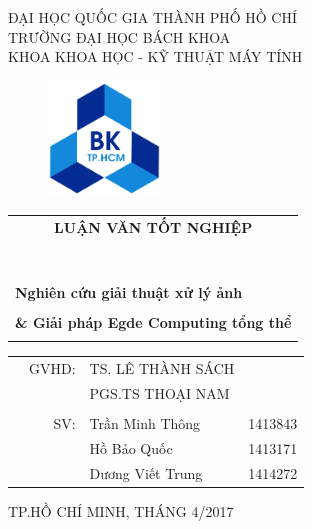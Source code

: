 \documentclass[a4paper]{report}
\begin{document}
\begin{titlepage}
\begin{center}
ĐẠI HỌC QUỐC GIA THÀNH PHỐ HỒ CHÍ  \\
TRƯỜNG ĐẠI HỌC BÁCH KHOA \\
KHOA KHOA HỌC - KỸ THUẬT MÁY TÍNH 
\end{center}

\vspace{1cm}

\begin{figure}[h!]
\begin{center}
\includegraphics[width=3cm]{hcmut.png}
\end{center}
\end{figure}

\begin{center}
\begin{tabular}{c}
	\multicolumn{1}{c}{\textbf{{\Huge LUẬN VĂN TỐT NGHIỆP}}}\\
	~~\\
	\\
	\\
	\hline
	\\
	\multicolumn{1}{l}{\textbf{{\huge Nghiên cứu giải thuật xử lý ảnh}}}\\
	\\
	
	\textbf{{\huge \& Giải pháp Egde Computing tổng thể}}\\
	\\
	\hline
\end{tabular}
\end{center}

\vspace{3cm}

\begin{table}[h]
\begin{tabular}{rrll}
\hspace{5 cm} & GVHD: &TS. LÊ THÀNH SÁCH&\\
& & PGS.TS THOẠI NAM\\
& & \\	
& SV: & Trần Minh Thông & 1413843\\
& & Hồ Bảo Quốc & 1413171 \\
& & Dương Viết Trung & 1414272\\

\end{tabular}
\end{table}

\begin{center}
{\footnotesize TP.HỒ CHÍ MINH, THÁNG 4/2017}
\end{center}
\end{titlepage}
\end{document}
